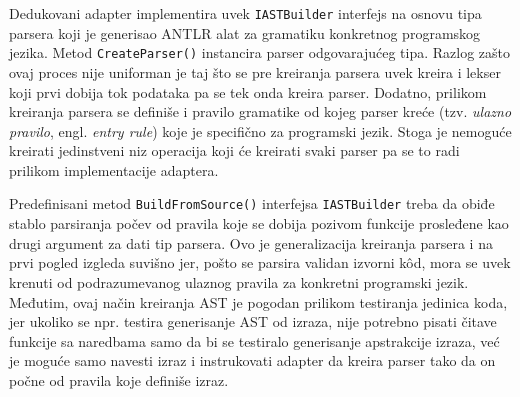 Dedukovani adapter implementira uvek \texttt{IASTBuilder} interfejs na osnovu tipa parsera koji je generisao ANTLR alat za gramatiku konkretnog programskog jezika. Metod \texttt{CreateParser()} instancira parser odgovarajućeg tipa. Razlog zašto ovaj proces nije uniforman je taj što se pre kreiranja parsera uvek kreira i lekser koji prvi dobija tok podataka pa se tek onda kreira parser. Dodatno, prilikom kreiranja parsera se definiše i pravilo gramatike od kojeg parser kreće (tzv. \emph{ulazno pravilo}, engl. \emph{entry rule}) koje je specifično za programski jezik. Stoga je nemoguće kreirati jedinstveni niz operacija koji će kreirati svaki parser pa se to radi prilikom implementacije adaptera. 

Predefinisani metod \texttt{BuildFromSource()} interfejsa \texttt{IASTBuilder} treba da obiđe stablo parsiranja počev od pravila koje se dobija pozivom funkcije prosleđene kao drugi argument za dati tip parsera. Ovo je generalizacija kreiranja parsera i na prvi pogled izgleda suvišno jer, pošto se parsira validan izvorni k\^od, mora se uvek krenuti od podrazumevanog ulaznog pravila za konkretni programski jezik. Međutim, ovaj način kreiranja AST je pogodan prilikom testiranja jedinica koda, jer ukoliko se npr. testira generisanje AST od izraza, nije potrebno pisati čitave funkcije sa naredbama samo da bi se testiralo generisanje apstrakcije izraza, već je moguće samo navesti izraz i instrukovati adapter da kreira parser tako da on počne od pravila koje definiše izraz.
